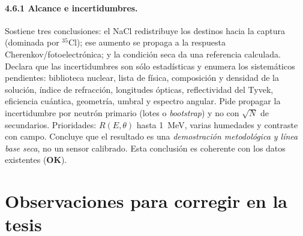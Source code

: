 \documentclass[11pt,a4paper]{article}
\newcommand{\ok}{\textcolor{green!50!black}{\textbf{OK}}}
\begin{document}
\paragraph{4.6.1 Alcance e incertidumbres.} Sostiene tres conclusiones: el NaCl redistribuye
los destinos hacia la captura (dominada por $^{35}$Cl); ese aumento se propaga a la respuesta
Cherenkov/fotoelectrónica; y la condición seca da una referencia calculada. Declara que las
incertidumbres son sólo estadísticas y enumera los sistemáticos pendientes: biblioteca nuclear,
lista de física, composición y densidad de la solución, índice de refracción, longitudes
ópticas, reflectividad del Tyvek, eficiencia cuántica, geometría, umbral y espectro angular.
Pide propagar la incertidumbre por neutrón primario (lotes o \emph{bootstrap}) y no con
$\sqrt{N}$ de secundarios. Prioridades: $R(E,\theta)$ hasta 1~MeV, varias humedades y
contraste con campo. Concluye que el resultado es una \emph{demostración metodológica y línea
base seca}, no un sensor calibrado. Esta conclusión es coherente con los datos existentes (\ok).

\section{Observaciones para corregir en la tesis}
\end{document}
